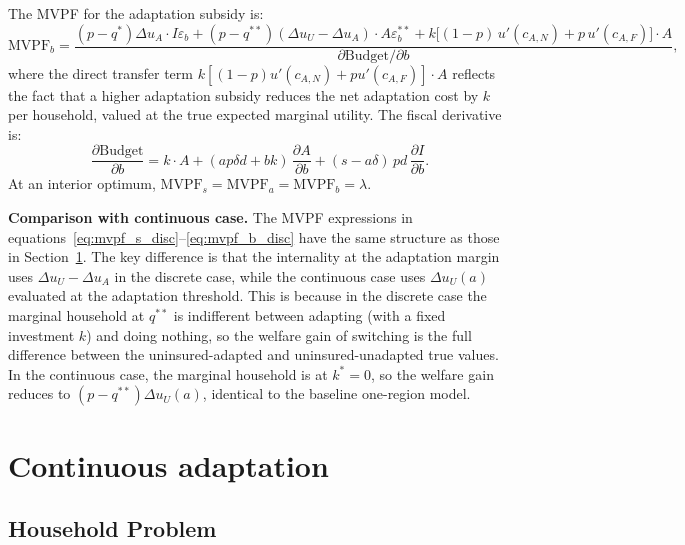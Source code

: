 \documentclass{article}
\begin{document}
The MVPF for the adaptation subsidy is:
\begin{equation}
    \mathrm{MVPF}_b = \frac{(p-q^*)\Delta u_A\cdot I\varepsilon_b
    + (p-q^{**})(\Delta u_U - \Delta u_A)\cdot A\varepsilon_b^{**}
    + k\bigl[(1-p)\,u'(c_{A,N}) + p\,u'(c_{A,F})\bigr]\cdot A}{\partial\mathrm{Budget}/\partial b},
    \label{eq:mvpf_b_disc}
\end{equation}
where the direct transfer term $k[(1-p)u'(c_{A,N})+pu'(c_{A,F})]\cdot A$ reflects the fact that a higher adaptation subsidy reduces the net adaptation cost by $k$ per household, valued at the true expected marginal utility. The fiscal derivative is:
\begin{equation}
    \frac{\partial\mathrm{Budget}}{\partial b} = k\cdot A
    + (ap\delta d + bk)\,\frac{\partial A}{\partial b}
    + (s-a\delta)\,pd\,\frac{\partial I}{\partial b}. \label{eq:budget_b_disc}
\end{equation}
At an interior optimum, $\mathrm{MVPF}_s = \mathrm{MVPF}_a = \mathrm{MVPF}_b = \lambda$.

\textbf{Comparison with continuous case.} The MVPF expressions in equations~\eqref{eq:mvpf_s_disc}--\eqref{eq:mvpf_b_disc} have the same structure as those in Section~\ref{sec:continuous}. The key difference is that the internality at the adaptation margin uses $\Delta u_U - \Delta u_A$ in the discrete case, while the continuous case uses $\Delta u_U(a)$ evaluated at the adaptation threshold. This is because in the discrete case the marginal household at $q^{**}$ is indifferent between adapting (with a fixed investment $k$) and doing nothing, so the welfare gain of switching is the full difference between the uninsured-adapted and uninsured-unadapted true values. In the continuous case, the marginal household is at $k^* = 0$, so the welfare gain reduces to $(p-q^{**})\Delta u_U(a)$, identical to the baseline one-region model.

\section{Continuous adaptation}
\label{sec:continuous}

\subsection{Household Problem}
\end{document}
